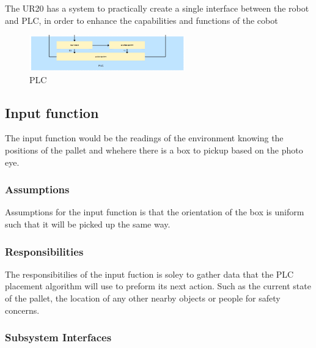 The UR20 has a system to practically create a single interface between the robot and PLC, in order to enhance the capabilities and functions of the cobot

\begin{figure}[h!]
	\centering
 	\includegraphics[width=0.60\textwidth]{images/Plc}
 \caption{PLC }
\end{figure}

\subsection{Input function}
The input function would be the readings of the environment knowing the positions of the pallet and whehere there is a box to pickup based on the photo eye.

\subsubsection{Assumptions}
Assumptions for the input function is that the orientation of the box is uniform such that it will be picked up the same way. 

\subsubsection{Responsibilities}
The responsibitilies of the input fuction is soley to gather data that the PLC placement algorithm will use to preform its next action. Such as the current state of the pallet, the location of any other nearby objects or people for safety concerns.

\subsubsection{Subsystem Interfaces}

